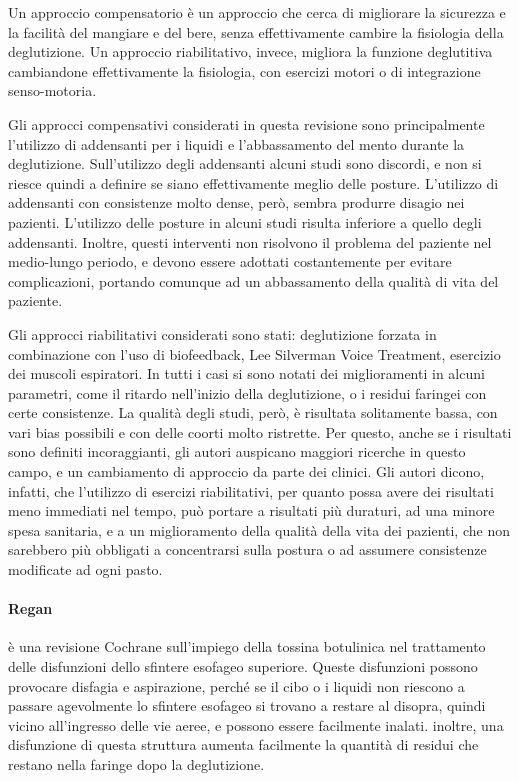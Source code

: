 Un approccio compensatorio è un approccio che cerca di migliorare la sicurezza 
e la facilità del mangiare e del bere, senza effettivamente cambire la 
fisiologia della deglutizione.
Un approccio riabilitativo, invece, migliora la funzione deglutitiva 
cambiandone effettivamente la fisiologia, con esercizi motori o di integrazione 
senso-motoria.

Gli approcci compensativi considerati in questa revisione sono principalmente 
l'utilizzo di addensanti per i liquidi e l'abbassamento del mento durante la 
deglutizione.
Sull'utilizzo degli addensanti alcuni studi sono discordi, e non si riesce 
quindi a definire se siano effettivamente meglio delle posture.
L'utilizzo di addensanti con consistenze molto dense, però, sembra produrre 
disagio nei pazienti.
L'utilizzo delle posture in alcuni studi risulta inferiore a quello degli 
addensanti.
Inoltre, questi interventi non risolvono il problema del paziente nel 
medio-lungo periodo, e devono essere adottati costantemente per evitare 
complicazioni, portando comunque ad un abbassamento della qualità di vita del 
paziente.

Gli approcci riabilitativi considerati sono stati: deglutizione forzata in 
combinazione con l'uso di biofeedback, Lee Silverman Voice Treatment, esercizio 
dei muscoli espiratori.
In tutti i casi si sono notati dei miglioramenti in alcuni parametri, come il 
ritardo nell'inizio della deglutizione, o i residui faringei con certe 
consistenze.
La qualità degli studi, però, è risultata solitamente bassa, con vari bias 
possibili e con delle coorti molto ristrette.
Per questo, anche se i risultati sono definiti incoraggianti, gli autori 
auspicano maggiori ricerche in questo campo, e un cambiamento di approccio da 
parte dei clinici.
Gli autori dicono, infatti, che l'utilizzo di esercizi riabilitativi, per 
quanto possa avere dei risultati meno immediati nel tempo, può portare a 
risultati più duraturi, ad una minore spesa sanitaria, e a un miglioramento 
della qualità della vita dei pazienti, che non sarebbero più obbligati a 
concentrarsi sulla postura o ad assumere consistenze modificate ad ogni pasto.

\paragraph{Regan} \label{par:reg} \cite{Regan2014} è una revisione Cochrane 
sull'impiego della tossina botulinica nel trattamento delle disfunzioni dello 
sfintere esofageo superiore.
Queste disfunzioni possono provocare disfagia e aspirazione, perché se il cibo 
o i liquidi non riescono a passare agevolmente lo sfintere esofageo si trovano 
a restare al disopra, quindi vicino all'ingresso delle vie aeree, e possono 
essere facilmente inalati.
inoltre, una disfunzione di questa struttura aumenta facilmente la quantità di 
residui che restano nella faringe dopo la deglutizione.

